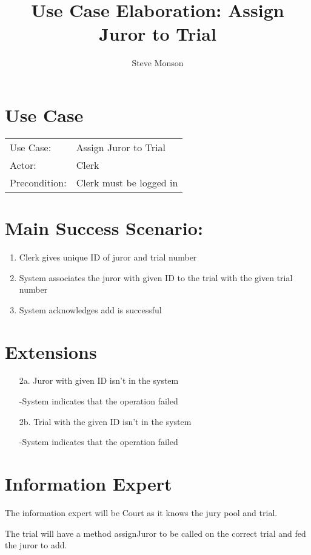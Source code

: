 \documentclass{article}
\title{Use Case Elaboration: Assign Juror to Trial}
\author{Steve Monson}
\begin{document}
\maketitle

\section*{Use Case}
\begin{tabular}{l l}
  Use Case:     & Assign Juror to Trial\\
  Actor:        & Clerk\\
  Precondition: & Clerk must be logged in\\
\end{tabular}

\section*{Main Success Scenario:}
\begin{enumerate}
  \item Clerk gives unique ID of juror and trial number
  \item System associates the juror with given ID to the trial with the given trial number
  \item System acknowledges add is successful
\end{enumerate}

\section*{Extensions}
\begin{itemize}
  \item [2a.] Juror with given ID isn't in the system
  
    -System indicates that the operation failed
  
  \item [2b.] Trial with the given ID isn't in the system

    -System indicates that the operation failed

\end{itemize}

\section*{Information Expert}

The information expert will be Court as it knows the jury pool and trial.

The trial will have a method assignJuror to be called on the correct trial and fed the juror to add. 
\end{document}
